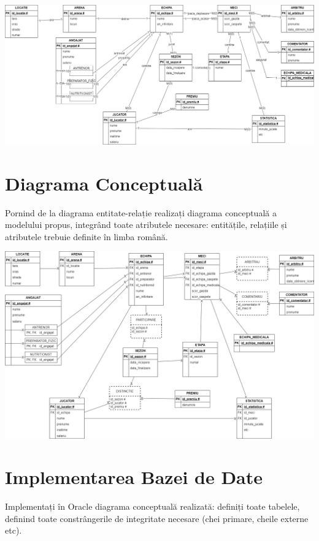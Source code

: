 \documentclass{article}
\begin{document}
\begin{center}

	\vspace{1cm}
	
	\includegraphics[width=\textwidth]{erd}
\end{center}
\pagebreak


\section{Diagrama Conceptuală}
Pornind de la diagrama entitate-relație realizați diagrama conceptuală a modelului propus, integrând
toate atributele necesare: entitățile, relațiile și atributele trebuie definite în limba română.

\begin{center}
	
	\vspace{1cm}
	
	\includegraphics[width=\textwidth]{diagrama-conceptuala}
\end{center}
\pagebreak


\section{Implementarea Bazei de Date}
Implementați în Oracle diagrama conceptuală realizată: definiți toate tabelele, definind toate
constrângerile de integritate necesare (chei primare, cheile externe etc).
\end{document}
